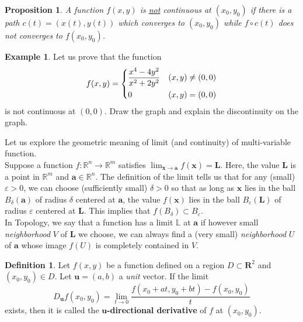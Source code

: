 \documentclass[t]{beamer}
\theoremstyle{plain}
\newtheorem{prop}[thm]{Proposition}
\theoremstyle{definition}
\newtheorem{defn}[thm]{Definition}
\newtheorem{exmp}[thm]{Example}
\begin{document}
\begin{frame}
\begin{prop}
	A function $f(x,y)$ is \underline{not} 
	continuous at $(x_0,y_0)$
	if there is a path $c(t)=(x(t),y(t))$ 
	which converges to $(x_0,y_0)$ while
	$f\circ c(t)$ does not converges to $f(x_0,y_0)$.
\end{prop}
\begin{exmp}
	Let us prove that the function
	$$f(x,y)=\begin{dcases}
	\frac{x^4-4y^2}{x^2+2y^2} & (x,y)\neq(0,0)\\
	0 & (x,y)=(0,0)\end{dcases}$$
	is not continuous at $(0,0)$.
	Draw the graph and explain 
	the discontinuity on the graph.
\end{exmp}
\end{frame}

\begin{frame}
Let us explore the geometric meaning of limit (and continuity) of multi-variable function. \\
\*\newline
Suppose a function $f:\mathbb R^n\to\mathbb R^m$ satisfies $\displaystyle\lim_{\mathbf x\to\mathbf a}f(\mathbf x)=\mathbf L$. Here, the value $\mathbf L$ is a point in $\mathbb R^m$ and $\mathbf a\in\mathbb R^n$. The definition of the limit tells us that for any (small) $\varepsilon>0$, we can choose (sufficiently small) $\delta>0$ so that as long as $\mathbf x$ lies in the ball $B_\delta(\mathbf a)$ of radius $\delta$ centered at $\mathbf a$, the value $f(\mathbf x)$ lies in the ball $B_\varepsilon(\mathbf L)$ of radius $\varepsilon$ centered at $\mathbf L$. This implies that $f(B_\delta)\subset B_\varepsilon$.\\
\*\newline
In Topology, we say that a function has a limit $\mathbb L$ at $\mathbf a$ 
if however small \emph{neighborhood} $V$ of $\mathbf L$ we choose, we can always find a (very small) \emph{neighborhood} $U$ of $\mathbf a$ whose image $f(U)$ is completely contained in $V$.
\end{frame}

\begin{frame}
\begin{defn}
	Let $f(x,y)$ be a function defined on 
	a region $D\subset\mathbf R^2$ and $(x_0,y_0)\in D$. 
	Let $\mathbf u=(a,b)$ a \emph{unit} vector. 
	If the limit
	$$D_{\mathbf u}f(x_0,y_0)
	= \lim_{t\rightarrow0}\frac{f(x_0+at,y_0+bt)
	- f(x_0,y_0)}{t}$$
	exists, then it is called 
	the \textbf{$\mathbf u$-directional derivative} 
	of $f$ at $(x_0,y_0)$.
\end{defn}
\end{frame}
\end{document}
